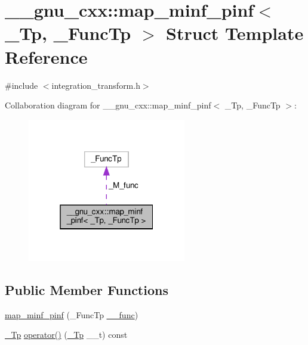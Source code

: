 \hypertarget{struct____gnu__cxx_1_1map__minf__pinf}{}\section{\+\_\+\+\_\+gnu\+\_\+cxx\+:\+:map\+\_\+minf\+\_\+pinf$<$ \+\_\+\+Tp, \+\_\+\+Func\+Tp $>$ Struct Template Reference}
\label{struct____gnu__cxx_1_1map__minf__pinf}


{\ttfamily \#include $<$integration\+\_\+transform.\+h$>$}



Collaboration diagram for \+\_\+\+\_\+gnu\+\_\+cxx\+:\+:map\+\_\+minf\+\_\+pinf$<$ \+\_\+\+Tp, \+\_\+\+Func\+Tp $>$\+:
\nopagebreak
\begin{figure}[H]
\begin{center}
\leavevmode
\includegraphics[width=196pt]{struct____gnu__cxx_1_1map__minf__pinf__coll__graph}
\end{center}
\end{figure}
\subsection*{Public Member Functions}
\begin{DoxyCompactItemize}
\item 
\hyperlink{struct____gnu__cxx_1_1map__minf__pinf_a7ffd9d3da4cb973ffe3f2fc6423f5491}{map\+\_\+minf\+\_\+pinf} (\+\_\+\+Func\+Tp \hyperlink{namespace____gnu__cxx_af2b2f0c7a2ae72b922b1afefae5a65b2}{\+\_\+\+\_\+func})
\item 
\hyperlink{namespace____gnu__cxx_a3b19a9c800ca194374ef9172290f7d79}{\+\_\+\+Tp} \hyperlink{struct____gnu__cxx_1_1map__minf__pinf_a39669672f547fb7979406452ec84bbc7}{operator()} (\hyperlink{namespace____gnu__cxx_a3b19a9c800ca194374ef9172290f7d79}{\+\_\+\+Tp} \+\_\+\+\_\+t) const
\end{DoxyCompactItemize}
